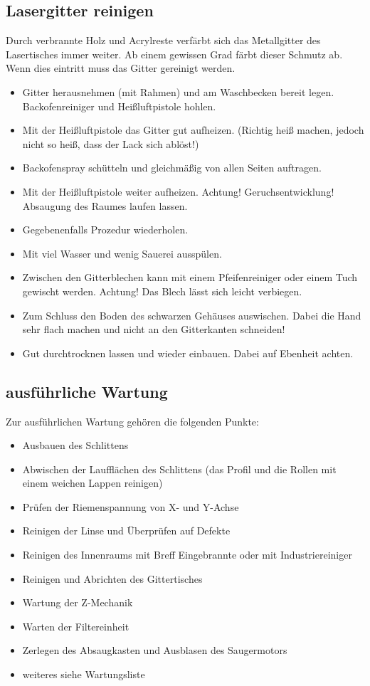 \documentclass{\basedir/fablab-document}
\begin{document}
	\subsection{Lasergitter reinigen}
	Durch verbrannte Holz und Acrylreste verfärbt sich das Metallgitter des Lasertisches immer weiter. Ab einem gewissen Grad färbt dieser Schmutz ab. Wenn dies eintritt muss das Gitter gereinigt werden.
	\begin{itemize}
		\item Gitter herausnehmen (mit Rahmen) und am Waschbecken bereit legen. Backofenreiniger und Heißluftpistole hohlen.
		\item Mit der Heißluftpistole das Gitter gut aufheizen. (Richtig heiß machen, jedoch nicht so heiß, dass der Lack sich ablöst!)
		\item Backofenspray schütteln und gleichmäßig von allen Seiten auftragen.
		\item Mit der Heißluftpistole weiter aufheizen. Achtung! Geruchsentwicklung! Absaugung des Raumes laufen lassen.
		\item Gegebenenfalls Prozedur wiederholen.
		\item Mit viel Wasser und wenig Sauerei ausspülen.
		\item Zwischen den Gitterblechen kann mit einem Pfeifenreiniger oder einem Tuch gewischt werden. Achtung! Das Blech lässt sich leicht verbiegen.
		\item Zum Schluss den Boden des schwarzen Gehäuses auswischen. Dabei die Hand sehr flach machen und nicht an den Gitterkanten schneiden!
		\item Gut durchtrocknen lassen und wieder einbauen. Dabei auf Ebenheit achten.
	\end{itemize}
	\subsection{ausführliche Wartung}
	Zur ausführlichen Wartung gehören die folgenden Punkte:
	\begin{itemize}
		\item Ausbauen des Schlittens
		\item Abwischen der Laufflächen des Schlittens (das Profil und die Rollen mit einem weichen Lappen reinigen)
		\item Prüfen der Riemenspannung von X- und Y-Achse
		\item Reinigen der Linse und Überprüfen auf Defekte
		\item Reinigen des Innenraums mit Breff Eingebrannte oder mit Industriereiniger
		\item Reinigen und Abrichten des Gittertisches
		\item Wartung der Z-Mechanik
		\item Warten der Filtereinheit
		\item Zerlegen des Absaugkasten und Ausblasen des Saugermotors
		\item weiteres siehe Wartungsliste
	\end{itemize}
\end{document}
